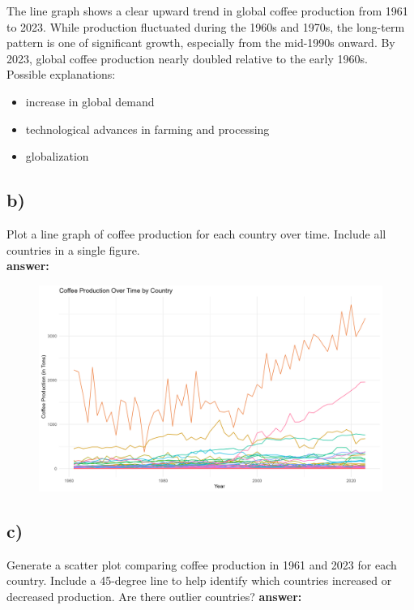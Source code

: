 \documentclass[12pt]{article}
\begin{document}
The line graph shows a clear upward trend in global coffee production from 1961 to 2023. While production fluctuated during the 1960s and 1970s, the long-term pattern is one of significant growth, especially from the mid-1990s onward. By 2023, global coffee production nearly doubled relative to the early 1960s.\\


Possible explanations:
\begin{itemize}
    \item increase in global demand
    \item technological advances in farming and processing
    \item globalization 
\end{itemize}


\subsection*{b)} Plot a line graph of coffee production for each country over time. Include all countries in a single figure.\\


\textbf{answer:}

\begin{figure}[h]
    \centering
    \includegraphics[width=1\linewidth]{Figures/HW_2.2_b.png}
\end{figure}

\subsection*{c)} Generate a scatter plot comparing coffee production in 1961 and 2023 for each country. Include a 45-degree line to help identify which countries increased or decreased production. Are there outlier countries? %
\clearpage
\textbf{answer:}
\end{document}
